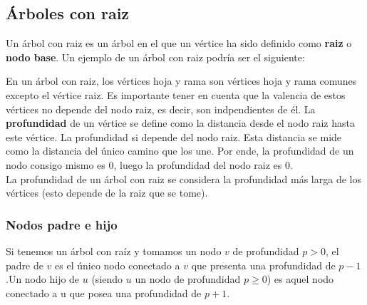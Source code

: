 \documentclass[11pt]{article}
\theoremstyle{plain}
\begin{document}
        \subsection{Árboles con raiz} %
        \label{sub:árboles_con_raiz}
            Un árbol con raiz es un árbol en el que un vértice ha sido definido como \textbf{raiz} o \textbf{nodo base}. Un ejemplo de un árbol con raiz podría ser el siguiente:
            \begin{center}
            \end{center}
            En un árbol con raiz, los vértices hoja y rama son vértices hoja y rama comunes excepto el vértice raiz. Es importante tener en cuenta que la valencia de estos vértices no depende del nodo raiz, es decir, son indpendientes de él. La \textbf{profundidad} de un vértice se define como la distancia desde el nodo raiz hasta este vértice. La profundidad si depende del nodo raiz. Esta distancia se mide como la distancia del único camino que los une. Por ende, la profundidad de un nodo consigo mismo es 0, luego la profundidad del nodo raiz es 0.\\

            La profundidad de un árbol con raiz se considera la profundidad más larga de los vértices (esto depende de la raiz que se tome).
            \subsubsection{Nodos padre e hijo} %
            \label{subsub:nodos_padre_e_hijo}
                Si tenemos un árbol con raíz y tomamos un nodo $v$ de profundidad $p>0$, el padre de $v$ es el único nodo conectado a $v$ que presenta una profundidad de $p-1$.Un nodo hijo de $u$ (siendo $u$ un nodo de profundidad $p\ge0$) es aquel nodo conectado a u que posea una profundidad de $p+1$.\\
\end{document}
